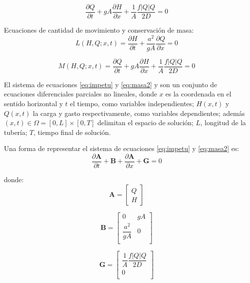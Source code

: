 \documentclass[letterpaper]{report}
\begin{document}
\begin{equation}
	\frac{\partial Q}{\partial t}+gA\frac{\partial H}{\partial x}+\frac{1}{A}\frac{f\left|Q\right|Q}{2D}=0
\end{equation}

Ecuaciones de cantidad de movimiento y conservación de masa:
\begin{equation}
	L(H,Q;x,t)=\frac{\partial H}{\partial t}+\frac{a^2}{gA}\frac{\partial Q}{\partial x}=0
\label{eq:impetu}
\end{equation}

\begin{equation}
	M(H,Q;x,t)=\frac{\partial Q}{\partial t}+gA\frac{\partial H}{\partial x}+\frac{1}{A}\frac{f\left|Q\right|Q}{2D}=0
\label{eq:masa2}
\end{equation}

El sistema de ecuaciones \ref{eq:impetu} y \ref{eq:masa2} y son un conjunto de ecuaciones diferenciales parciales no lineales, 
donde $x$ es la coordenada en el sentido horizontal y $t$ el tiempo, como variables independientes; $H(x,t)$ y $Q(x,t)$ 
la carga y gasto respectivamente, como variables dependientes; además $(x,t) \in \Omega=[0,L] \times [0,T]$ 
delimitan el espacio de solución; $L$, longitud de la tubería; $T$, tiempo final de solución.\bigskip
 
Una forma de representar el sistema de ecuaciones \ref{eq:impetu} y \ref{eq:masa2} es:
\begin{equation}
	\frac{\partial \mathbf{A}}{\partial t}+\mathbf{B}+\frac{\partial \mathbf{A}}{\partial x}+\mathbf{G} = 0
\end{equation}	

donde:
\begin{equation}
	\mathbf{A}= 
	\begin{bmatrix*}
		Q\\
		H
	\end{bmatrix*}
\end{equation}

\begin{equation}
	\mathbf{B}= 
	\begin{bmatrix*}
		0 & gA\\
		\dfrac{a^2}{gA} & 0 \\
	\end{bmatrix*}
\end{equation}

\begin{equation}
	\mathbf{G}= 
	\begin{bmatrix*}
		\dfrac{1}{A}\dfrac{f|Q|Q}{2D} \\
		 0 \\
	\end{bmatrix*}
\end{equation}
\end{document}
